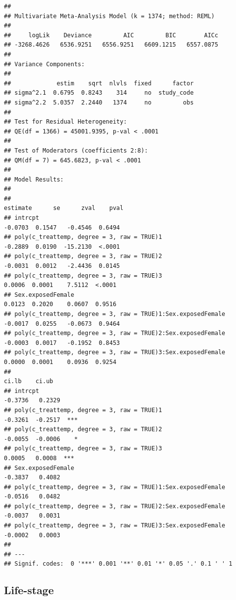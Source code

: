 \documentclass[
]{article}
\begin{document}
\begin{verbatim}
## 
## Multivariate Meta-Analysis Model (k = 1374; method: REML)
## 
##     logLik    Deviance         AIC         BIC        AICc   
## -3268.4626   6536.9251   6556.9251   6609.1215   6557.0875   
## 
## Variance Components:
## 
##             estim    sqrt  nlvls  fixed      factor 
## sigma^2.1  0.6795  0.8243    314     no  study_code 
## sigma^2.2  5.0357  2.2440   1374     no         obs 
## 
## Test for Residual Heterogeneity:
## QE(df = 1366) = 45001.9395, p-val < .0001
## 
## Test of Moderators (coefficients 2:8):
## QM(df = 7) = 645.6823, p-val < .0001
## 
## Model Results:
## 
##                                                               estimate      se      zval    pval 
## intrcpt                                                        -0.0703  0.1547   -0.4546  0.6494 
## poly(c_treattemp, degree = 3, raw = TRUE)1                     -0.2889  0.0190  -15.2130  <.0001 
## poly(c_treattemp, degree = 3, raw = TRUE)2                     -0.0031  0.0012   -2.4436  0.0145 
## poly(c_treattemp, degree = 3, raw = TRUE)3                      0.0006  0.0001    7.5112  <.0001 
## Sex.exposedFemale                                               0.0123  0.2020    0.0607  0.9516 
## poly(c_treattemp, degree = 3, raw = TRUE)1:Sex.exposedFemale   -0.0017  0.0255   -0.0673  0.9464 
## poly(c_treattemp, degree = 3, raw = TRUE)2:Sex.exposedFemale   -0.0003  0.0017   -0.1952  0.8453 
## poly(c_treattemp, degree = 3, raw = TRUE)3:Sex.exposedFemale    0.0000  0.0001    0.0936  0.9254 
##                                                                 ci.lb    ci.ub      
## intrcpt                                                       -0.3736   0.2329      
## poly(c_treattemp, degree = 3, raw = TRUE)1                    -0.3261  -0.2517  *** 
## poly(c_treattemp, degree = 3, raw = TRUE)2                    -0.0055  -0.0006    * 
## poly(c_treattemp, degree = 3, raw = TRUE)3                     0.0005   0.0008  *** 
## Sex.exposedFemale                                             -0.3837   0.4082      
## poly(c_treattemp, degree = 3, raw = TRUE)1:Sex.exposedFemale  -0.0516   0.0482      
## poly(c_treattemp, degree = 3, raw = TRUE)2:Sex.exposedFemale  -0.0037   0.0031      
## poly(c_treattemp, degree = 3, raw = TRUE)3:Sex.exposedFemale  -0.0002   0.0003      
## 
## ---
## Signif. codes:  0 '***' 0.001 '**' 0.01 '*' 0.05 '.' 0.1 ' ' 1
\end{verbatim}

\hypertarget{life-stage}{%
\subsection{Life-stage}\label{life-stage}}
\end{document}
